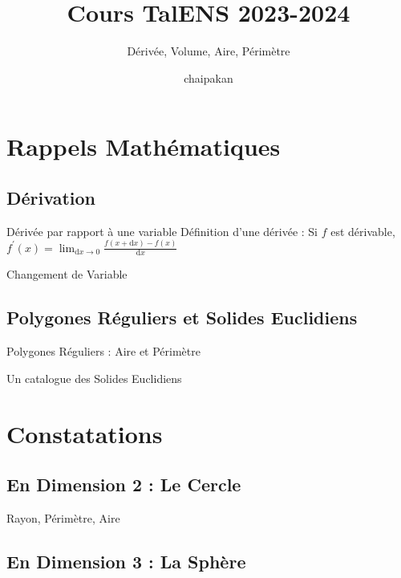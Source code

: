 \documentclass{beamercours}
\title{Cours TalENS 2023-2024}
\subtitle{Dérivée, Volume, Aire, Périmètre}
\date{chaipakan}
\begin{document}
\maketitle

    \section{Rappels Mathématiques}
        \subsection{Dérivation}
            \begin{frame}{Dérivée par rapport à une variable}
                Définition d'une dérivée : Si $f$ est dérivable, $f^{'}(x) = \lim_{\mathrm{d}x \rightarrow 0} \frac{f(x + \mathrm{d}x) - f(x)}{\mathrm{d}x}$
            \end{frame}

            
            \begin{frame}{Changement de Variable}
                
            \end{frame}

        \subsection{Polygones Réguliers et Solides Euclidiens}
            \begin{frame}{Polygones Réguliers : Aire et Périmètre}
                
            \end{frame}
            \begin{frame}{Un catalogue des Solides Euclidiens}
                
            \end{frame}

    \section{Constatations}
        \subsection{En Dimension 2 : Le Cercle}
            \begin{frame}{Rayon, Périmètre, Aire}

            \end{frame}

        \subsection{En Dimension 3 : La Sphère}
\end{document}
